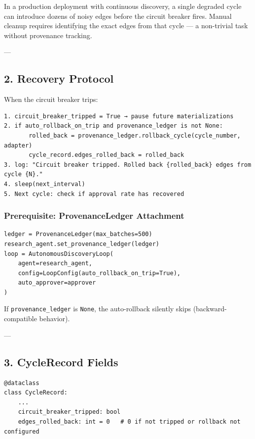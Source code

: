 In a production deployment with continuous discovery, a single degraded cycle can introduce dozens of noisy edges before the circuit breaker fires. Manual cleanup requires identifying the exact edges from that cycle — a non-trivial task without provenance tracking.

---

\subsection{2. Recovery Protocol}

When the circuit breaker trips:

\begin{lstlisting}
1. circuit_breaker_tripped = True → pause future materializations
2. if auto_rollback_on_trip and provenance_ledger is not None:
       rolled_back = provenance_ledger.rollback_cycle(cycle_number, adapter)
       cycle_record.edges_rolled_back = rolled_back
3. log: "Circuit breaker tripped. Rolled back {rolled_back} edges from cycle {N}."
4. sleep(next_interval)
5. Next cycle: check if approval rate has recovered
\end{lstlisting}

\subsubsection{Prereq\-uisite: ProvenanceLedger Attachment}

\begin{lstlisting}
ledger = ProvenanceLedger(max_batches=500)
research_agent.set_provenance_ledger(ledger)
loop = AutonomousDiscoveryLoop(
    agent=research_agent,
    config=LoopConfig(auto_rollback_on_trip=True),
    auto_approver=approver
)
\end{lstlisting}

If \texttt{provenance\_ledger} is \texttt{None}, the auto-rollback silently skips (backward-compatible behavior).

---

\subsection{3. CycleRecord Fields}

\begin{lstlisting}
@dataclass
class CycleRecord:
    ...
    circuit_breaker_tripped: bool
    edges_rolled_back: int = 0   # 0 if not tripped or rollback not configured
\end{lstlisting}

